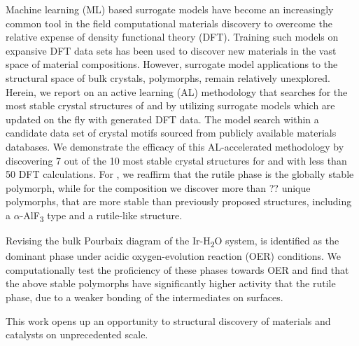 %



%
Machine learning (ML) based surrogate models have become an increasingly common tool in the field computational materials discovery to overcome the relative expense of  density functional theory (DFT).
%
Training such models on expansive DFT data sets has been used to discover new materials in the vast space of material compositions. However, surrogate model applications to the structural space of bulk crystals,  polymorphs, remain relatively unexplored.
%
%
Herein, we report on an active learning (AL) methodology that searches for the most stable crystal structures of \IrOtwo and \IrOthree by utilizing surrogate models which are updated on the fly with generated DFT data. The model search within a candidate data set of crystal motifs sourced from publicly available materials databases.
We demonstrate the efficacy of this AL-accelerated methodology by discovering 7 out of the 10 most stable crystal structures for \IrOtwo and \IrOthree with less than 50 DFT calculations.
%
For \IrOtwo, we reaffirm that the rutile phase is the globally stable polymorph,
while for the \IrOthree composition we discover more than ?? unique polymorphs, that are more stable than previously proposed structures, including a $\alpha$-AlF\textsubscript{3} type and a rutile-like \IrOthree structure.

%
%
Revising the bulk Pourbaix diagram of the Ir-H\textsubscript{2}O system, \IrOthree is identified as the dominant phase under acidic oxygen-evolution reaction (OER) conditions.
%
We computationally test the proficiency of these phases towards OER and find that the above stable \IrOthree polymorphs have significantly higher activity that the rutile \IrOtwo phase, due to a weaker bonding of the intermediates on \IrOthree surfaces.   
%

This work opens up an opportunity to structural discovery of materials and catalysts on unprecedented scale.
